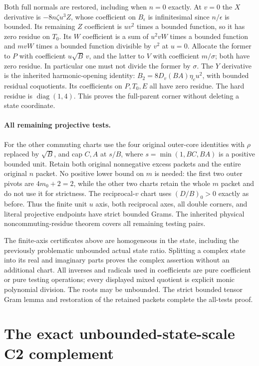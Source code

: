 Both full normals are restored, including when $n=0$ exactly.
At $v=0$ the $X$ derivative is $-8n\zeta u^3Z$, whose coefficient
on $B_\epsilon$ is infinitesimal since $n/\epsilon$ is bounded.
Its remaining $Z$ coefficient is $uv^2$ times a bounded function,
so it has zero residue on $T_0$.  Its $W$ coefficient is a sum of
$u^2vW$ times a bounded function and $mvW$ times a bounded
function divisible by $v^2$ at $u=0$.  Allocate the former to
$P$ with coefficient $u\sqrt B\,v$, and the latter to $V$ with
coefficient $m/\sigma$; both have zero residue.  In particular one
must not divide the former by $\sigma$.
The $Y$ derivative is the inherited harmonic-opening identity:
$B_2=8D_v(BA)\eta_cu^2$, with bounded residual coquotients.
Its coefficients on $P,T_0,E$ all have zero residue.  The hard
residue is $\operatorname{diag}(1,4)$.  This proves the full-parent
corner without deleting a state coordinate.

\paragraph{All remaining projective tests.}
For the other commuting charts use the four original outer-core
identities with $\rho$ replaced by $\sqrt B$, and cap $C,A$ at
$s/B$, where $s=\min(1,BC,BA)$ is a positive bounded unit.
Retain both original nonnegative excess packets and the entire
original $n$ packet.  No positive lower bound on $m$ is needed:
the first two outer pivots are $4m_0+2=2$, while the other two
charts retain the whole $m$ packet and do not use it for strictness.
The reciprocal-$v$ chart uses $(D/B)_0>0$ exactly as before.
Thus the finite unit $u$ axis, both reciprocal axes, all double
corners, and literal projective endpoints have strict bounded
Grams.  The inherited physical noncommuting-residue theorem covers
all remaining testing pairs.

The finite-axis certificates above are homogeneous in the state,
including the previously problematic unbounded actual state
ratio.  Splitting a complex state into its real and imaginary
parts proves the complex assertion without an additional chart.
All inverses and radicals used in coefficients are pure coefficient
or pure testing operations; every displayed mixed quotient is
explicit monic polynomial division.  The roots may be unbounded.
The strict bounded tensor Gram lemma and restoration of the retained
packets complete the all-tests proof.


\section{\texorpdfstring{The exact unbounded-state-scale C2 complement}{The exact unbounded-state-scale C2 complement}}
\label{component:pb60046a37191}

